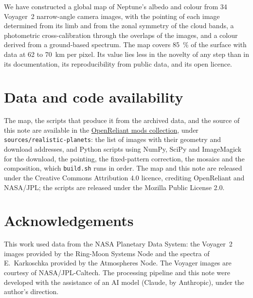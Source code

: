 \documentclass[11pt,a4paper]{article}
\begin{document}
We have constructed a global map of Neptune's albedo and colour from 34 Voyager~2 narrow-angle
camera images, with the pointing of each image determined from its limb and from the zonal
symmetry of the cloud bands, a photometric cross-calibration through the overlaps of the images,
and a colour derived from a ground-based spectrum. The map covers \SI{85}{\percent} of the surface
with data at 62 to 70~km per pixel. Its value lies less in the novelty of any step than in its
documentation, its reproducibility from public data, and its open licence.

\section*{Data and code availability}

The map, the scripts that produce it from the archived data, and the source of this note are
available in the \href{https://github.com/OpenReliant/openreliant-mods}{OpenReliant mods
collection}, under \texttt{sources/realistic-planets}: the list of images with their geometry and
download addresses, and Python scripts using NumPy, SciPy and ImageMagick for the download, the
pointing, the fixed-pattern correction, the mosaics and the composition, which \texttt{build.sh}
runs in order. The map and this note are released under the Creative Commons Attribution 4.0
licence, crediting OpenReliant and NASA/JPL; the scripts are released under the Mozilla Public
License 2.0.

\section*{Acknowledgements}

This work used data from the NASA Planetary Data System: the Voyager~2 images provided by the
Ring-Moon Systems Node and the spectra of E.~Karkoschka provided by the Atmospheres Node. The
Voyager images are courtesy of NASA/JPL-Caltech. The processing pipeline and this note were
developed with the assistance of an AI model (Claude, by Anthropic), under the author's
direction.
\end{document}

